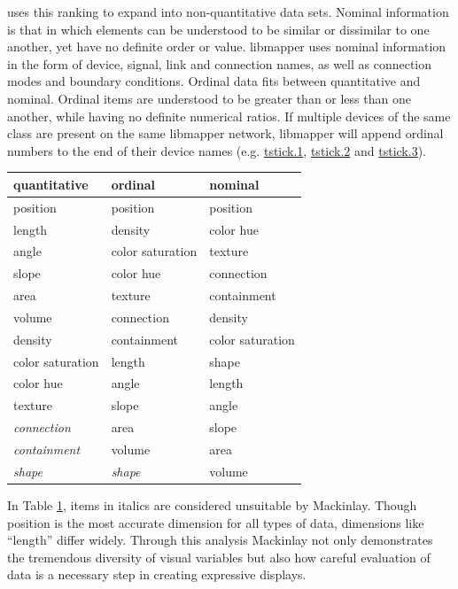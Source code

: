  uses this ranking to expand into non-quantitative data sets. Nominal information is that in which elements can be understood to be similar or dissimilar to one another, yet have no definite order or value. libmapper uses nominal information in the form of device, signal, link and connection names, as well as connection modes and boundary conditions. Ordinal data fits between quantitative and nominal. Ordinal items are understood to be greater than or less than one another, while having no definite numerical ratios. If multiple devices of the same class are present on the same libmapper network, libmapper will append ordinal numbers to the end of their device names (e.g. \url{tstick.1}, \url{tstick.2} and \url{tstick.3}).

\begin{table}
\setlength{\tabcolsep}{12pt}
	\centering
	\label{tab:graphical_rankings}
		\begin{tabular}{l l l}
		\textbf{quantitative}&	\textbf{ordinal}	&	\textbf{nominal}\\
		\hline\hline
		position 			& 	position 			&	position 		\\
		length 				& 	density 			&	color hue 		\\
		angle 				& 	color saturation 	&	texture 		\\
		slope				&	color hue 			&	connection 		\\
		area				&	texture				&	containment 	\\
		volume				&	connection 			&	density 		\\
		density				&	containment 		&	color saturation\\
		color saturation	&	length 				&	shape 			\\
		color hue			&	angle 				&	length 			\\
		texture				&	slope 				&	angle 			\\
		\emph{connection}	&	area 				&	slope 			\\
		\emph{containment}	&	volume 				&	area 			\\
		\emph{shape}		&	\emph{shape} 		&	volume 			\\
		\hline
	\end{tabular}
\end{table}

In Table \ref{tab:graphical_rankings}, items in italics are considered unsuitable by Mackinlay. Though position is the most accurate dimension for all types of data, dimensions like ``length'' differ widely. Through this analysis Mackinlay not only demonstrates the tremendous diversity of visual variables but also how careful evaluation of data is a necessary step in creating expressive displays.

